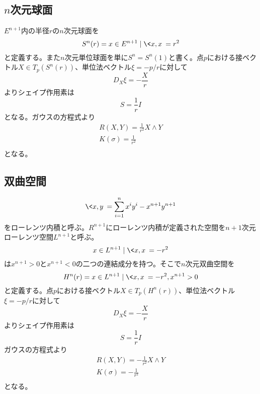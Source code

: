     \subsection{$n$次元球面}
        $E^{n+1}$内の半径$r$の$n$次元球面を
            \[S^n(r) = {x \in E^{n+1} \mid \<x, x\> = r^2}\]
        と定義する。また$n$次元単位球面を単に$S^n = S^n(1)$と書く。点$p$における接ベクトル$X \in T_p(S^n(r))$、単位法ベクトル$\xi = -p/r$に対して
            \[D_X\xi = -\frac{X}{r}\]
        よりシェイプ作用素は
            \[S = \frac{1}{r}I\]
        となる。ガウスの方程式より
        \begin{align*}
            R(X, Y) = \frac{1}{r^2}X \wedge Y\\
            K(\sigma) = \frac{1}{r^2}\\
        \end{align*}
        となる。
    \subsection{双曲空間}
            \[\<x, y\> = \sum_{i=1}^n x^iy^i - x^{n+1}y^{n+1}\]
        をローレンツ内積と呼ぶ。$R^{n+1}$にローレンツ内積が定義された空間を$n+1$次元ローレンツ空間$L^{n+1}$と呼ぶ。
            \[{x \in L^{n+1} \mid \<x, x\> = -r^2}\]
        は$x^{n+1} > 0$と$x^{n+1} < 0$の二つの連結成分を持つ。そこで$n$次元双曲空間を
            \[H^n(r) = {x \in L^{n+1} \mid \<x, x\> = -r^2, x^{n+1} > 0}\]
        と定義する。点$p$における接ベクトル$X \in T_p(H^n(r))$、単位法ベクトル$\xi = -p/r$に対して
            \[D_X\xi = -\frac{X}{r}\]
        よりシェイプ作用素は
            \[S = \frac{1}{r}I\]
        ガウスの方程式より
        \begin{align*}
            R(X, Y) = -\frac{1}{r^2}X \wedge Y\\
            K(\sigma) = -\frac{1}{r^2}\\
        \end{align*}
        となる。

